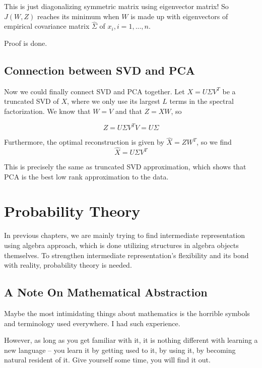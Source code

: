 \documentclass[a4paper]{book}
\begin{document}
  This is just diagonalizing symmetric matrix using eigenvector matrix!
  So $J(W, Z)$ reaches its minimum when $W$ is made up with eigenvectors
  of empirical covariance matrix $\hat{\Sigma}$ of $x_{i}, i = 1, ...,
  n$.

  Proof is done.

  \section{Connection between SVD and PCA}
  
  Now we could finally connect SVD and PCA together. Let $X = U\Sigma
  V^{T}$ be a truncated SVD of $X$, where we only use its largest $L$
  terms in the spectral factorization. We know that $W = V$ and that $Z
  = XW$, so

  \begin{displaymath}
    Z = U\Sigma V^{T}V = U\Sigma
  \end{displaymath}

  Furthermore, the optimal reconstruction is given by $\hat{X} =
  ZW^{T}$, so we find
  \begin{displaymath}
    \hat{X} = U\Sigma V^{T}
  \end{displaymath}

  This is precisely the same as truncated SVD approximation, which shows
  that PCA is the best low rank approximation to the data.

\chapter{Probability Theory}
\label{chp:probability_theory}

In previous chapters, we are mainly trying to find intermediate
representation using algebra approach, which is done utilizing
structures in algebra objects themselves. To strengthen intermediate
representation's flexibility and its bond with reality, probability theory
is needed.

  \section{A Note On Mathematical Abstraction}

  Maybe the most intimidating things about mathematics is the horrible
  symbols and terminology used everywhere. I had such experience.

  However, as long as you get familiar with it, it is nothing different
  with learning a new language -- you learn it by getting used to it, by
  using it, by becoming natural resident of it. Give yourself some time,
  you will find it out.
\end{document}
